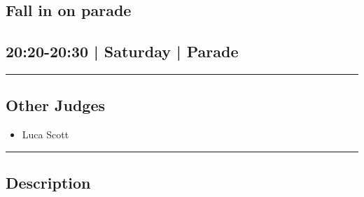 \documentclass[10pt, A5]{article}
\begin{document}
		\begin{framed}
			\begin{minipage}{\textwidth}

			\setcounter{section}{73}
							\section{Fall in on parade}
						
			\subsection*{20:20-20:30 | Saturday | Parade}

			\vspace{0.25cm}
			\hrule
			\vspace{0.25cm}


			\subsection*{Other Judges}
							

				\begin{multicols}{2}

			\begin{itemize}
											\item Luca Scott
								\end{itemize}

			\vfill\null
			\columnbreak

			\begin{itemize}
								\end{itemize}

			\vfill\null

			\end{multicols}

			\vspace{0.25cm}
			\hrule
			\vspace{0.25cm}

			\begin{minipage}{\textwidth}
			\subsection*{\faListAlt \: Description}
			
			\end{minipage}


	\end{minipage}
	\end{framed}

	
\end{document}

